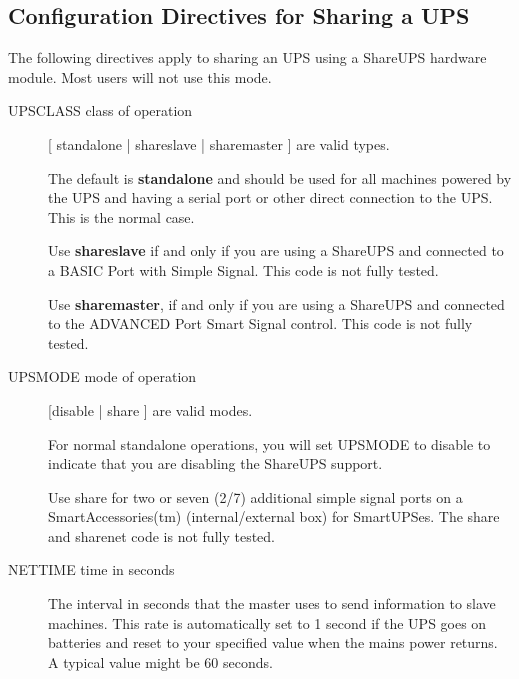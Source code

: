 {{{{{{{\subsection*{Configuration Directives for Sharing a UPS}

\label{index-Directives-Sharing-247}
The following directives apply to sharing an UPS using a ShareUPS hardware
module. Most users will not use this mode.

\begin{description}

\item [UPSCLASS \lt{}class of operation\gt{}]
   [ standalone | shareslave | sharemaster ] are valid types.

The default is {\bf standalone} and should be used for all machines powered by
the UPS and having a serial port or other direct connection to the UPS. 
This is the normal case.

Use {\bf shareslave} if and only if you are using a ShareUPS and connected to
a BASIC Port with Simple Signal. This code is not fully tested.  

Use {\bf sharemaster}, if and only if you are using a ShareUPS and connected
to the ADVANCED Port Smart Signal control. This code is not fully tested.  

\item [UPSMODE \lt{}mode of operation\gt{}]
   [disable | share ] are valid modes.

For normal standalone operations, you will set UPSMODE to disable to indicate
that you are disabling the ShareUPS support.  

Use share for two or seven (2/7) additional simple signal ports on a
SmartAccessories(tm) (internal/external box) for SmartUPSes. The share and
sharenet code is not fully tested.  

\item [NETTIME \lt{}time in seconds\gt{}]
   The interval in seconds that the master uses to send information to slave
machines. This rate is automatically set to 1 second if the UPS goes on
batteries and reset to your specified value when the mains power returns. A
typical value might be 60 seconds.  
\end{description}

}}}}}}}
